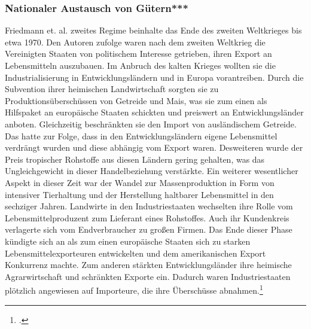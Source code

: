 \documentclass{scrartcl}
\begin{document}
\subsubsection*{Nationaler Austausch von Gütern***}
Friedmann et. al. zweites Regime beinhalte das Ende des zweiten Weltkrieges bis etwa 1970. Den Autoren zufolge waren nach dem zweiten Weltkrieg die Vereinigten Staaten von politischem Interesse getrieben, ihren Export an Lebensmitteln auszubauen. Im Anbruch des kalten Krieges wollten sie die Industrialisierung in Entwicklungsländern und in Europa vorantreiben. Durch die Subvention ihrer heimischen Landwirtschaft sorgten sie zu Produktionsüberschüssen von Getreide und Mais, was sie zum einen als Hilfspaket an europäische Staaten schickten und preiswert an Entwicklungsländer anboten. Gleichzeitig beschränkten sie den Import von ausländischem Getreide. Das hatte zur Folge, dass in den Entwicklungsländern eigene Lebensmittel verdrängt wurden und diese abhängig vom Export waren. Desweiteren wurde der Preis tropischer Rohstoffe aus diesen Ländern gering gehalten, was das Ungleichgewicht in dieser Handelbeziehung verstärkte. Ein weiterer wesentlicher Aspekt in dieser Zeit war der Wandel zur Massenproduktion in Form von intensiver Tierhaltung und der Herstellung haltbarer Lebensmittel in den sechziger Jahren. Landwirte in den Industriestaaten wechselten ihre Rolle vom Lebensmittelproduzent zum Lieferant eines Rohstoffes. Auch ihr Kundenkreis verlagerte sich vom Endverbraucher zu großen Firmen. Das Ende dieser Phase kündigte sich an als zum einen europäische Staaten sich zu starken Lebensmittelexporteuren entwickelten und dem amerikanischen Export Konkurrenz machte. Zum anderen stärkten Entwicklungsländer ihre heimische Agrarwirtschaft und schränkten Exporte ein. Dadurch waren Industriestaaten plötzlich angewiesen auf Importeure, die ihre Überschüsse abnahmen.\footcite[Vgl.][S.103ff]{Friedmann1989AGRICULTUREPresent}
\end{document}
